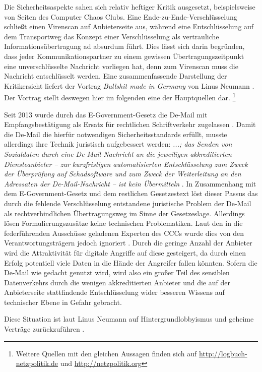 \documentclass[
	12pt,
	a4paper,
	BCOR10mm,
	DIV14,
	listof=totoc,
	bibliography=totoc,
	headsepline
]{scrreprt}
\begin{document}
Die Sicherheitsaspekte sahen sich relativ heftiger Kritik ausgesetzt, beispielsweise von Seiten des Computer Chaos Clubs.
Eine Ende-zu-Ende-Verschlüsselung schließt einen Virenscan auf Anbieterseite aus, während eine Entschlüsselung auf dem Transportweg das Konzept einer Verschlüsselung als vertrauliche Informationsübertragung ad absurdum führt.
Dies lässt sich darin begründen, dass jeder Kommunikationspartner zu einem gewissen Übertragungszeitpunkt eine unverschlüsselte Nachricht vorliegen hat, denn zum Virenscan muss die Nachricht entschlüsselt werden.
Eine zusammenfassende Darstellung der Kritikersicht liefert der Vortrag \textit{Bullshit made in Germany} von Linus Neumann \cite{bsinger}.
Der Vortrag stellt deswegen hier im folgenden eine der Hauptquellen dar. \footnote{Weitere Quellen mit den gleichen Aussagen finden sich auf \url{http://logbuch-netzpolitik.de} und \url{http://netzpolitik.org}}

Seit 2013 wurde durch das E-Government-Gesetz die De-Mail mit Empfangsbestätigung als Ersatz für rechtlichen Schriftverkehr zugelassen \cite{egov}.
Damit die De-Mail die hierfür notwendigen Sicherheitsstandards erfüllt, musste allerdings ihre Technik juristisch aufgebessert werden:
\textit{ ...; das Senden von Sozialdaten durch eine De-Mail-Nachricht an die jeweiligen akkreditierten Diensteanbieter – zur kurzfristigen automatisierten Entschlüsselung zum Zweck der Überprüfung auf Schadsoftware und zum Zweck der Weiterleitung an den Adressaten der De-Mail-Nachricht – ist kein Übermitteln\grqq} \cite{sozgesb10}.
In Zusammenhang mit dem E-Government-Gesetz und dem restlichen Gesetzestext löst dieser Passus das durch die fehlende Verschlüsselung entstandene juristische Problem der De-Mail als rechtverbindlichen Übertragungsweg im Sinne der Gesetzeslage.
Allerdings lösen Formulierungszusätze keine technischen Problematiken. 
Laut den in die federführenden Ausschüsse geladenen Experten des CCCs wurde dies von den Verantwortungsträgern jedoch ignoriert \cite{bsinger}.
Durch die geringe Anzahl der Anbieter wird die Attraktivität für digitale Angriffe auf diese gesteigert, da durch einen Erfolg potentiell viele Daten in die Hände der Angreifer fallen könnten.
Sofern die De-Mail wie gedacht genutzt wird, wird also ein großer Teil des sensiblen Datenverkehrs durch die wenigen akkreditierten Anbieter und die auf der Anbieterseite stattfindende Entschlüsselung wider besseren Wissens auf technischer Ebene in Gefahr gebracht.

Diese Situation ist laut Linus Neumann auf Hintergrundlobbyismus und geheime Verträge zurückzuführen \cite{bsinger}.
\end{document}
